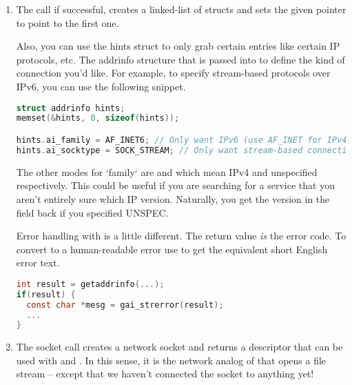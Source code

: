 \begin{enumerate}

\item {}

The  call if successful, creates a linked-list of  structs and sets the given pointer to point to the first one.

Also, you can use the hints struct to only grab certain entries like certain IP protocols, etc.
The addrinfo structure that is passed into  to define the kind of connection you'd like.
For example, to specify stream-based protocols over IPv6, you can use the following snippet.

\begin{lstlisting}[language=C]
struct addrinfo hints;
memset(&hints, 0, sizeof(hints));

hints.ai_family = AF_INET6; // Only want IPv6 (use AF_INET for IPv4)
hints.ai_socktype = SOCK_STREAM; // Only want stream-based connection
\end{lstlisting}

The other modes for `family` are  and  which mean IPv4 and unspecified respectively.
This could be useful if you are searching for a service that you aren't entirely sure which IP version.
Naturally, you get the version in the field back if you specified UNSPEC.

Error handling with  is a little different.
The return value \emph{is} the error code.
To convert to a human-readable error use  to get the equivalent short English error text.

\begin{lstlisting}[language=C]
int result = getaddrinfo(...);
if(result) {
  const char *mesg = gai_strerror(result);
  ...
}
\end{lstlisting}


\item {}

The socket call creates a network socket and returns a descriptor that can be used with  and .
In this sense, it is the network analog of  that opens a file stream -- except that we haven't connected the socket to anything yet!


\end{enumerate}
